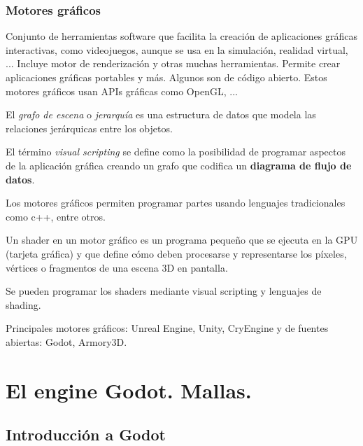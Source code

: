 \documentclass[12pt]{report} %
\begin{document}
\hypertarget{motores-gruxe1ficos}{%
\subsection{Motores gráficos}\label{motores-gruxe1ficos}}

\begin{definicion}
Conjunto de herramientas software que facilita la creación de aplicaciones gráficas interactivas, como videojuegos, aunque se usa en la simulación, realidad virtual, ... Incluye motor de renderización y otras muchas herramientas. Permite crear aplicaciones gráficas portables y más. Algunos son de código abierto. Estos motores gráficos usan APIs gráficas como OpenGL, ...
\end{definicion}

El \emph{grafo de escena} o \emph{jerarquía} es una estructura de datos
que modela las relaciones jerárquicas entre los objetos.

El término \emph{visual scripting} se define como la posibilidad de
programar aspectos de la aplicación gráfica creando un grafo que
codifica un \textbf{diagrama de flujo de datos}.

Los motores gráficos permiten programar partes usando lenguajes
tradicionales como c++, entre otros.

\begin{definicion}
Un shader en un motor gráfico es un programa pequeño que se ejecuta en la GPU (tarjeta gráfica) y que define cómo deben procesarse y representarse los píxeles, vértices o fragmentos de una escena 3D en pantalla.
\end{definicion}

Se pueden programar los shaders mediante visual scripting y lenguajes de
shading.

Principales motores gráficos: Unreal Engine, Unity, CryEngine y de
fuentes abiertas: Godot, Armory3D.

\hypertarget{el-engine-godot.-mallas.}{%
\chapter{El engine Godot. Mallas.}\label{el-engine-godot.-mallas.}}

\hypertarget{introducciuxf3n-a-godot}{%
\section{Introducción a Godot}\label{introducciuxf3n-a-godot}}
\end{document}
